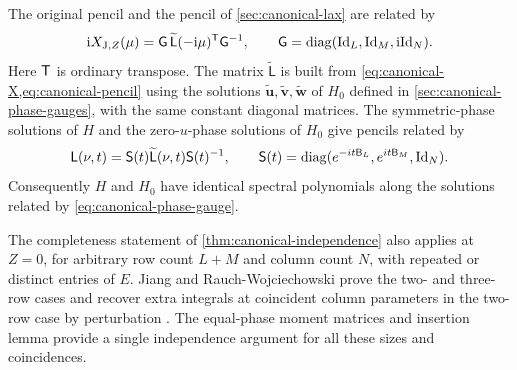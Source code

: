 The original pencil and the pencil of \cref{sec:canonical-lax} are related by
\begin{equation}\label{eq:JRW-pencil-map}
 \mathrm i X_{{\rm J},Z}(\mu)
 =\mathsf G\,\widetilde{\mathsf L}(-\mathrm i\mu)^{\mathsf T}\mathsf G^{-1},
 \qquad \mathsf G=\operatorname{diag}(\mathrm{Id}_L,\mathrm{Id}_M,\mathrm i\mathrm{Id}_N).
\end{equation}
Here $\mathsf T$ is ordinary transpose. The matrix $\widetilde{\mathsf L}$
is built from \cref{eq:canonical-X,eq:canonical-pencil} using the
solutions $\tilde{\boldsymbol u},\tilde{\boldsymbol v},\tilde{\boldsymbol w}$
of $H_0$ defined in \cref{sec:canonical-phase-gauges}, with the same
constant diagonal matrices. The symmetric-phase solutions of $H$ and
the zero-$u$-phase solutions of $H_0$ give pencils related by
\begin{equation}\label{eq:canonical-pencil-gauge}
 \mathsf L(\nu,t)=\mathsf S(t)\widetilde{\mathsf L}(\nu,t)
                         \mathsf S(t)^{-1},\qquad
 \mathsf S(t)=\operatorname{diag}(e^{-it\mathsf B_L},e^{it\mathsf B_M},\mathrm{Id}_N).
\end{equation}
Consequently $H$ and $H_0$ have identical spectral polynomials along
the solutions related by \cref{eq:canonical-phase-gauge}.

The completeness statement of \cref{thm:canonical-independence} also
applies at $Z=0$, for arbitrary row count $L+M$ and column count $N$, with repeated or distinct entries of $E$.
Jiang and Rauch-Wojciechowski prove the two- and three-row cases and
recover extra integrals at coincident column parameters in the
two-row case by perturbation \cite[Section II.C, equation (2.23)]{JRW1991}.
The equal-phase moment matrices and insertion lemma provide a single
independence argument for all these sizes and coincidences.
